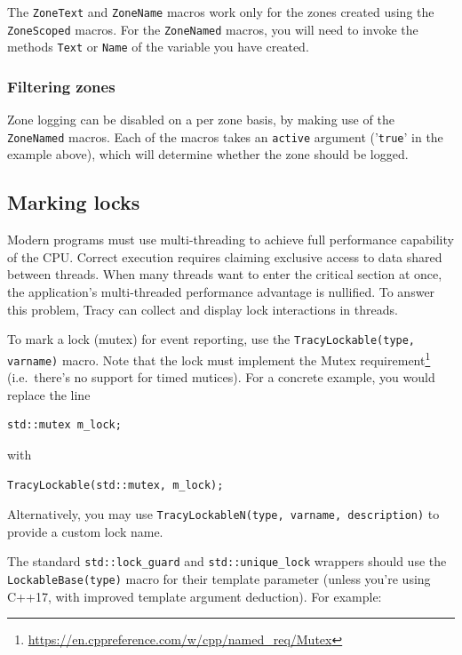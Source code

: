 \documentclass[hidelinks,titlepage,a4paper]{article}
\begin{document}
The \texttt{ZoneText} and \texttt{ZoneName} macros work only for the zones created using the \texttt{ZoneScoped} macros. For the \texttt{ZoneNamed} macros, you will need to invoke the methods \texttt{Text} or \texttt{Name} of the variable you have created.

\subsubsection{Filtering zones}
\label{filteringzones}

Zone logging can be disabled on a per zone basis, by making use of the \texttt{ZoneNamed} macros. Each of the macros takes an \texttt{active} argument ('\texttt{true}' in the example above), which will determine whether the zone should be logged.

\subsection{Marking locks}

Modern programs must use multi-threading to achieve full performance capability of the CPU. Correct execution requires claiming exclusive access to data shared between threads. When many threads want to enter the critical section at once, the application's multi-threaded performance advantage is nullified. To answer this problem, Tracy can collect and display lock interactions in threads. 

To mark a lock (mutex) for event reporting, use the \texttt{TracyLockable(type, varname)} macro. Note that the lock must implement the Mutex requirement\footnote{\url{https://en.cppreference.com/w/cpp/named_req/Mutex}} (i.e.\ there's no support for timed mutices). For a concrete example, you would replace the line

\begin{lstlisting}
std::mutex m_lock;
\end{lstlisting}

with

\begin{lstlisting}
TracyLockable(std::mutex, m_lock);
\end{lstlisting}

Alternatively, you may use \texttt{TracyLockableN(type, varname, description)} to provide a custom lock name.

The standard \texttt{std::lock\_guard} and \texttt{std::unique\_lock} wrappers should use the \texttt{LockableBase(type)} macro for their template parameter (unless you're using C++17, with improved template argument deduction). For example:
\end{document}
